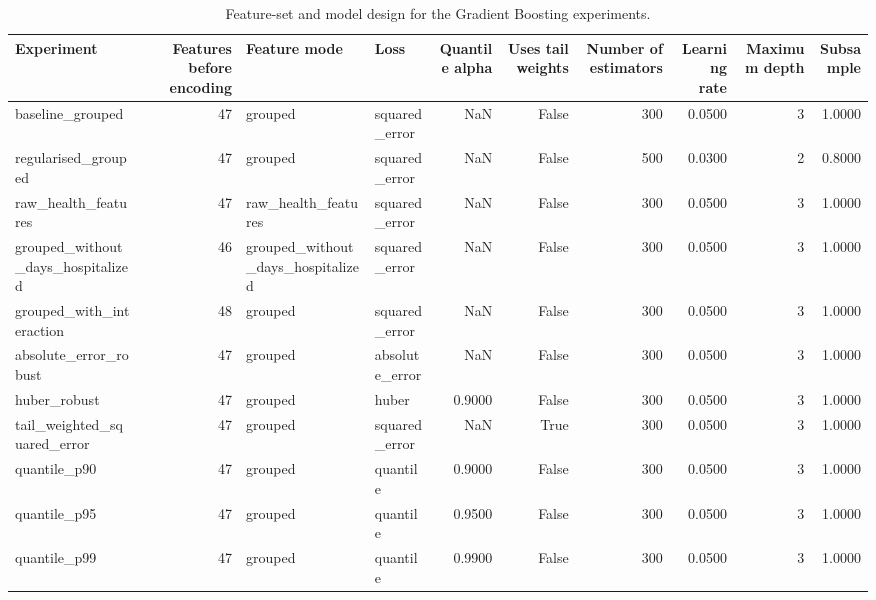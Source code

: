 \begin{table}
\caption{Feature-set and model design for the Gradient Boosting experiments.}
\label{tab:06-gb-feature-set-summary}
\begin{tabular}{lrllrrrrrr}
\toprule
Experiment & Features before encoding & Feature mode & Loss & Quantile alpha & Uses tail weights & Number of estimators & Learning rate & Maximum depth & Subsample \\
\midrule
baseline_grouped & 47 & grouped & squared_error & NaN & False & 300 & 0.0500 & 3 & 1.0000 \\
regularised_grouped & 47 & grouped & squared_error & NaN & False & 500 & 0.0300 & 2 & 0.8000 \\
raw_health_features & 47 & raw_health_features & squared_error & NaN & False & 300 & 0.0500 & 3 & 1.0000 \\
grouped_without_days_hospitalized & 46 & grouped_without_days_hospitalized & squared_error & NaN & False & 300 & 0.0500 & 3 & 1.0000 \\
grouped_with_interaction & 48 & grouped & squared_error & NaN & False & 300 & 0.0500 & 3 & 1.0000 \\
absolute_error_robust & 47 & grouped & absolute_error & NaN & False & 300 & 0.0500 & 3 & 1.0000 \\
huber_robust & 47 & grouped & huber & 0.9000 & False & 300 & 0.0500 & 3 & 1.0000 \\
tail_weighted_squared_error & 47 & grouped & squared_error & NaN & True & 300 & 0.0500 & 3 & 1.0000 \\
quantile_p90 & 47 & grouped & quantile & 0.9000 & False & 300 & 0.0500 & 3 & 1.0000 \\
quantile_p95 & 47 & grouped & quantile & 0.9500 & False & 300 & 0.0500 & 3 & 1.0000 \\
quantile_p99 & 47 & grouped & quantile & 0.9900 & False & 300 & 0.0500 & 3 & 1.0000 \\
\bottomrule
\end{tabular}
\end{table}
